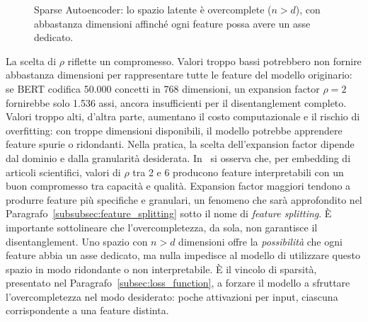\begin{figure}[htbp]
    \centering
    \caption{Sparse Autoencoder: lo spazio latente è overcomplete ($n > d$), con abbastanza dimensioni affinché ogni feature possa avere un asse dedicato.}
    \label{fig:sae_overcomplete}
\end{figure}
La scelta di $\rho$ riflette un compromesso. Valori troppo bassi potrebbero non fornire abbastanza dimensioni per rappresentare tutte le feature del modello originario: se BERT codifica 50.000 concetti in 768 dimensioni, un expansion factor $\rho = 2$ fornirebbe solo 1.536 assi, ancora insufficienti per il disentanglement completo. Valori troppo alti, d'altra parte, aumentano il costo computazionale e il rischio di overfitting: con troppe dimensioni disponibili, il modello potrebbe apprendere feature spurie o ridondanti.
Nella pratica, la scelta dell'expansion factor dipende dal dominio e dalla granularità desiderata. In~\parencite{oneill2024disentangling} si osserva che, per embedding di articoli scientifici, valori di $\rho$ tra 2 e 6 producono feature interpretabili con un buon compromesso tra capacità e qualità. Expansion factor maggiori tendono a produrre feature più specifiche e granulari, un fenomeno che sarà approfondito nel Paragrafo~\ref{subsubsec:feature_splitting} sotto il nome di \textit{feature splitting}.
È importante sottolineare che l'overcompletezza, da sola, non garantisce il disentanglement. Uno spazio con $n > d$ dimensioni offre la \textit{possibilità} che ogni feature abbia un asse dedicato, ma nulla impedisce al modello di utilizzare questo spazio in modo ridondante o non interpretabile. È il vincolo di sparsità, presentato nel Paragrafo~\ref{subsec:loss_function}, a forzare il modello a sfruttare l'overcompletezza nel modo desiderato: poche attivazioni per input, ciascuna corrispondente a una feature distinta.

